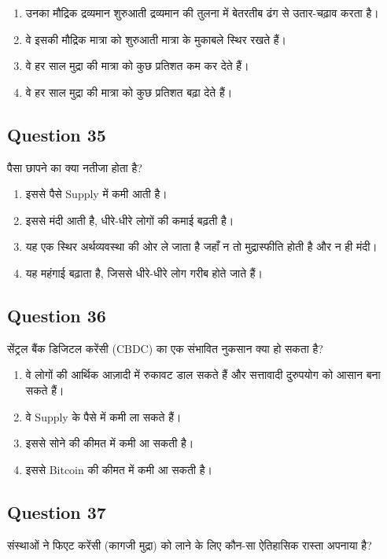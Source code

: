 \documentclass[12pt,a4paper]{article}
\begin{document}
\begin{enumerate}[label=\Alph*., leftmargin=*]
\item उनका मौद्रिक द्रव्यमान शुरुआती द्रव्यमान की तुलना में बेतरतीब ढंग से उतार-चढ़ाव करता है।
\item वे इसकी मौद्रिक मात्रा को शुरुआती मात्रा के मुकाबले स्थिर रखते हैं।
\item वे हर साल मुद्रा की मात्रा को कुछ प्रतिशत कम कर देते हैं।
\item वे हर साल मुद्रा की मात्रा को कुछ प्रतिशत बढ़ा देते हैं।
\end{enumerate}

\bigskip


\subsection*{Question 35}
पैसा छापने का क्या नतीजा होता है?

\begin{enumerate}[label=\Alph*., leftmargin=*]
\item इससे पैसे Supply में कमी आती है।
\item इससे मंदी आती है, धीरे-धीरे लोगों की कमाई बढ़ती है।
\item यह एक स्थिर अर्थव्यवस्था की ओर ले जाता है जहाँ न तो मुद्रास्फीति होती है और न ही मंदी।
\item यह महंगाई बढ़ाता है, जिससे धीरे-धीरे लोग गरीब होते जाते हैं।
\end{enumerate}

\bigskip


\subsection*{Question 36}
सेंट्रल बैंक डिजिटल करेंसी (CBDC) का एक संभावित नुकसान क्या हो सकता है?

\begin{enumerate}[label=\Alph*., leftmargin=*]
\item वे लोगों की आर्थिक आज़ादी में रुकावट डाल सकते हैं और सत्तावादी दुरुपयोग को आसान बना सकते हैं।
\item वे Supply के पैसे में कमी ला सकते हैं।
\item इससे सोने की कीमत में कमी आ सकती है।
\item इससे Bitcoin की कीमत में कमी आ सकती है।
\end{enumerate}

\bigskip


\subsection*{Question 37}
संस्थाओं ने फिएट करेंसी (कागजी मुद्रा) को लाने के लिए कौन-सा ऐतिहासिक रास्ता अपनाया है?
\end{document}
